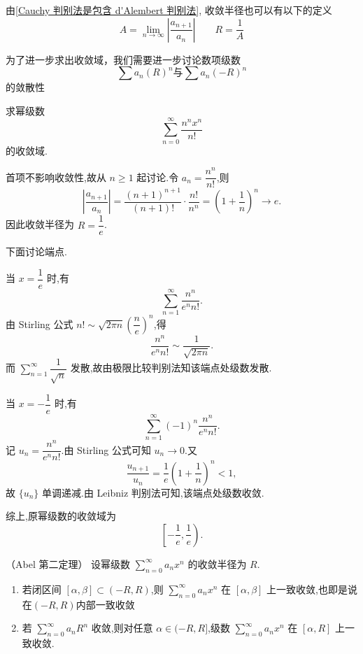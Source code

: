 由\ref{Cauchy 判别法是包含 d'Alembert 判别法},
收敛半径也可以有以下的定义
\[A = \lim\limits_{n\to \infty}|\frac{a_{n+1}}{a_n}|\qquad R=\frac{1}{A}\]

为了进一步求出收敛域，我们需要进一步讨论数项级数\[\sum a_n(R)^n\text{与}\sum a_n(-R)^n\]的敛散性



\begin{example}
	求幂级数
	\[
	\sum_{n=0}^{\infty}\frac{n^n x^n}{n!}
	\]
	的收敛域.
\end{example}

\begin{solution}
	首项不影响收敛性,故从 \(n\geq 1\) 起讨论.令 \(a_n=\dfrac{n^n}{n!}\),则
	\[
	\left|\frac{a_{n+1}}{a_n}\right|
	=
	\frac{(n+1)^{n+1}}{(n+1)!}\cdot\frac{n!}{n^n}
	=
	\left(1+\frac{1}{n}\right)^n
	\longrightarrow e.
	\]
	因此收敛半径为 \(R=\dfrac{1}{e}\).
	
	下面讨论端点.
	
	当 \(x=\dfrac{1}{e}\) 时,有
	\[
	\sum_{n=1}^{\infty}\frac{n^n}{e^n n!}.
	\]
	由 Stirling 公式 \(n!\sim \sqrt{2\pi n}\left(\dfrac{n}{e}\right)^n\),得
	\[
	\frac{n^n}{e^n n!}\sim \frac{1}{\sqrt{2\pi n}}.
	\]
	而 \(\sum\limits_{n=1}^{\infty}\dfrac{1}{\sqrt{n}}\) 发散,故由极限比较判别法知该端点处级数发散.
	
	当 \(x=-\dfrac{1}{e}\) 时,有
	\[
	\sum_{n=1}^{\infty}(-1)^n\frac{n^n}{e^n n!}.
	\]
	记 \(u_n=\dfrac{n^n}{e^n n!}\).由 Stirling 公式可知 \(u_n\to 0\).又
	\[
	\frac{u_{n+1}}{u_n}
	=
	\frac{1}{e}\left(1+\frac{1}{n}\right)^n<1,
	\]
	故 \(\{u_n\}\) 单调递减.由 Leibniz 判别法可知,该端点处级数收敛.
	
	综上,原幂级数的收敛域为
	\[
	\left[-\frac{1}{e},\frac{1}{e}\right).
	\]
\end{solution}

\begin{theorem}（Abel 第二定理）
	设幂级数 \(\sum\limits_{n=0}^{\infty}a_nx^n\) 的收敛半径为 \(R\).
	
	\begin{enumerate}
		\item 若闭区间 \([\alpha,\beta]\subset(-R,R)\),则 \(\sum\limits_{n=0}^{\infty}a_nx^n\) 在 \([\alpha,\beta]\) 上一致收敛,也即是说在$(-R,R)$内部一致收敛
		
		\item 若 \(\sum\limits_{n=0}^{\infty}a_nR^n\) 收敛,则对任意 \(\alpha\in(-R,R]\),级数 \(\sum\limits_{n=0}^{\infty}a_nx^n\) 在 \([\alpha,R]\) 上一致收敛.
	\end{enumerate}
\end{theorem}

